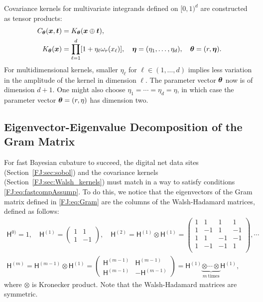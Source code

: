 \documentclass[graybox,footinfo]{svmult}
\begin{document}
Covariance kernels for multivariate integrands defined on $[0,1)^d$ are constructed as tensor products:
\begin{align}
\label{FJ:eqn:digital_shift_in_kernel}
C_{\bstheta}(\bsx, \bst) &= K_{\bstheta} (\bsx \oplus \bst), \\
\label{FJ:eqn:walsh_kernel_multi}
K_{\bstheta} (\bsx) & =  
\prod_{\ell=1}^d  [1 + \eta_\ell \omega_{r} (x_\ell)], \quad \bseta = (\eta_1, \ldots, \eta_d), \quad \bstheta = (r, \bseta).
\end{align}
For multidimensional kernels, smaller $\eta_\ell$ for $\ell \in (1, \dots, d)$ implies less variation in the amplitude of the kernel in dimension $\ell$.  
The parameter vector ${\boldsymbol{\theta}}$ now is of dimension $d+1$.  One might also choose $\eta_1 = \cdots = \eta_d = \eta$, in which case the parameter vector ${\boldsymbol{\theta}} = (r,\eta)$ has dimension two.

\subsection{Eigenvector-Eigenvalue Decomposition of the Gram Matrix}

For fast Bayesian cubature to succeed, the digital net data sites (Section~\ref{FJ:sec:sobol}) and the covariance kernels (Section~\ref{FJ:sec:Walsh_kernels}) must match in a way to satisfy  conditions \eqref{FJ:eq:fastcompAssump}.  To do this, we notice that the eigenvectors of the Gram matrix defined in \eqref{FJ:eq:Gram} are the columns of the Walsh-Hadamard matrices, defined as follows:
\begin{gather}
\nonumber
\mathsf{H}^{0)} = 1, \quad \mathsf{H}^{(1)} =
\begin{pmatrix}
1 & 1 \\ 1 & -1
\end{pmatrix}, \quad
\mathsf{H}^{(2)} = \mathsf{H}^{(1)} \otimes \mathsf{H}^{(1)} = 
\begin{pmatrix}
1 & 1 & 1 & 1 \\ 
1 & -1 & 1 & -1 \\
1 & 1 & -1 & -1 \\ 
1 & -1 & -1 & 1 \\
\end{pmatrix}, \cdots
\\
\label{FJ:eqn:hadamard_matrix}
\mathsf{H}^{(m)} = \mathsf{H}^{(m-1)} \otimes \mathsf{H}^{(1)} =
\begin{pmatrix}
\mathsf{H}^{(m-1)} & \mathsf{H}^{(m-1)} \\ \mathsf{H}^{(m-1)} & -\mathsf{H}^{(m-1)}
\end{pmatrix} 
= \mathsf{H}^{(1)} \underbrace{\otimes \cdots \otimes}_{m \ \text{times}}  \mathsf{H}^{(1)}, 
\end{gather}
where $\otimes$ is Kronecker product.
Note that the Walsh-Hadamard matrices are symmetric.
\end{document}
